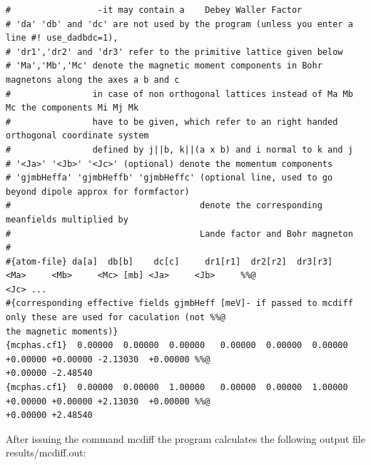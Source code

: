 {\begin{verbatim}
#                 -it may contain a    Debey Waller Factor
# 'da' 'db' and 'dc' are not used by the program (unless you enter a line #! use_dadbdc=1), 
# 'dr1','dr2' and 'dr3' refer to the primitive lattice given below
# 'Ma','Mb','Mc' denote the magnetic moment components in Bohr magnetons along the axes a b and c
#                in case of non orthogonal lattices instead of Ma Mb Mc the components Mi Mj Mk
#                have to be given, which refer to an right handed orthogonal coordinate system 
#                defined by j||b, k||(a x b) and i normal to k and j
# '<Ja>' '<Jb>' '<Jc>' (optional) denote the momentum components 
# 'gjmbHeffa' 'gjmbHeffb' 'gjmbHeffc' (optional line, used to go beyond dipole approx for formfactor)
#                                     denote the corresponding meanfields multiplied by 
#                                     Lande factor and Bohr magneton 
#
#{atom-file} da[a]  db[b]    dc[c]     dr1[r1]  dr2[r2]  dr3[r3]   <Ma>     <Mb>     <Mc> [mb] <Ja>     <Jb>     %%@
<Jc> ...
#{corresponding effective fields gjmbHeff [meV]- if passed to mcdiff only these are used for caculation (not %%@
the magnetic moments)}
{mcphas.cf1}  0.00000  0.00000  0.00000   0.00000  0.00000  0.00000   +0.00000 +0.00000 -2.13030  +0.00000 %%@
+0.00000 -2.48540
{mcphas.cf1}  0.00000  0.00000  1.00000   0.00000  0.00000  1.00000   +0.00000 +0.00000 +2.13030  +0.00000 %%@
+0.00000 +2.48540

\end{verbatim}
}

After issuing the command {\prg mcdiff} 
the program calculates the following output file {\prg results/mcdiff.out}:

